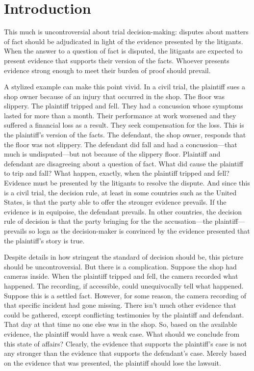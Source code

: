 \documentclass[
  10pt,
  dvipsnames,enabledeprecatedfontcommands]{scrartcl}
\begin{document}
\hypertarget{introduction}{%
\section{Introduction}\label{introduction}}

This much is uncontroversial about trial decision-making: disputes about
matters of fact should be adjudicated in light of the evidence presented
by the litigants. When the answer to a question of fact is disputed, the
litigants are expected to present evidence that supports their version
of the facts. Whoever presents evidence strong enough to meet their
burden of proof should prevail.

A stylized example can make this point vivid. In a civil trial, the
plaintiff sues a shop owner because of an injury that occurred in the
shop. The floor was slippery. The plaintiff tripped and fell. They had a
concussion whose symptoms lasted for more than a month. Their
performance at work worsened and they suffered a financial loss as a
result. They seek compensation for the loss. This is the plaintiff's
version of the facts. The defendant, the shop owner, responds that the
floor was not slippery. The defendant did fall and had a
concussion---that much is undisputed---but not because of the slippery
floor. Plaintiff and defendant are disagreeing about a question of fact.
What did cause the plaintiff to trip and fall? What happen, exactly,
when the plaintiff tripped and fell? Evidence must be presented by the
litigants to resolve the dispute. And since this is a civil trial, the
decision rule, at least in some countries such as the United States, is
that the party able to offer the stronger evidence prevails. If the
evidence is in equipoise, the defendant prevails. In other countries,
the decision rule of decision is that the party bringing for the the
accusation---the plaintiff---prevails so logn as the decision-maker is
convinced by the evidence presented that the plaintiff's story is true.

Despite details in how stringent the standard of decision should be,
this picture should be uncontroversial. But there is a complication.
Suppose the shop had cameras inside. When the plaintiff tripped and
fell, the camera recorded what happened. The recording, if accessible,
could unequivocally tell what happened. Suppose this is a settled fact.
However, for some reason, the camera recording of that specific incident
had gone missing. There isn't much other evidence that could be
gathered, except conflicting testimonies by the plaintiff and defendant.
That day at that time no one else was in the shop. So, based on the
available evidence, the plaintiff would have a weak case. What should we
conclude from this state of affairs? Clearly, the evidence that supports
the plaintiff's case is not any stronger than the evidence that supports
the defendant's case. Merely based on the evidence that was presented,
the plaintiff should lose the lawsuit.
\end{document}
